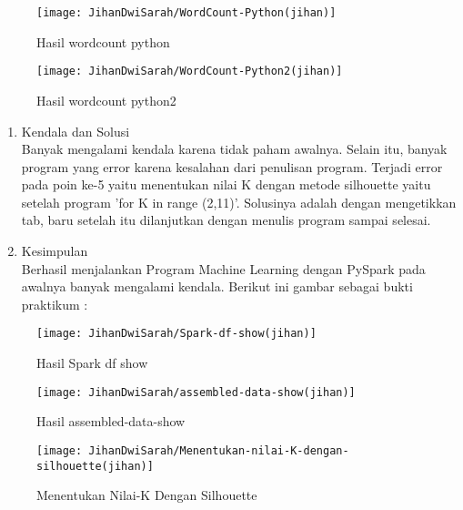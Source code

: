 \begin{enumerate}
\begin{figure}[!ht]
\texttt{[image: JihanDwiSarah/WordCount-Python(jihan)]}
\caption{Hasil wordcount python}
\label{gam:WordCount-Python(jihan)}
\end{figure} 



\begin{figure}[!ht]
\texttt{[image: JihanDwiSarah/WordCount-Python2(jihan)]}
\caption{Hasil wordcount python2}
\label{gam:WordCount-Python2(jihan)}
\end{figure} 

\end{enumerate}


\begin{enumerate}
\item Kendala dan Solusi \\
Banyak mengalami kendala karena tidak paham awalnya. Selain itu, banyak program yang error karena kesalahan dari penulisan program. Terjadi error pada poin ke-5 yaitu menentukan nilai K dengan metode silhouette yaitu setelah program 'for K in range (2,11)'. Solusinya adalah dengan mengetikkan tab, baru setelah itu dilanjutkan dengan menulis program sampai selesai.

\item Kesimpulan  \\
Berhasil menjalankan Program Machine Learning dengan PySpark pada awalnya banyak mengalami kendala. Berikut ini gambar sebagai bukti praktikum : 
\end{enumerate}
\begin{figure}[!ht]
\texttt{[image: JihanDwiSarah/Spark-df-show(jihan)]}
\caption{Hasil Spark df show}
\label{gam:Spark-df-show(jihan)}
\end{figure}

\begin{figure}[!ht]
\texttt{[image: JihanDwiSarah/assembled-data-show(jihan)]}
\caption{Hasil assembled-data-show}
\label{gam:assembled-data-show(jihan)}
\end{figure}

\newpage
\begin{figure}[!ht]
\texttt{[image: JihanDwiSarah/Menentukan-nilai-K-dengan-silhouette(jihan)]}
\caption{Menentukan Nilai-K Dengan Silhouette}
\label{gam:Menentukan-nilai-K-dengan-silhouette(jihan)}
\end{figure}

